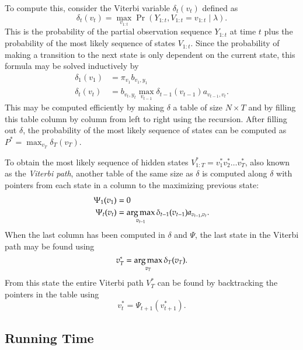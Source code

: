 To compute this, consider the Viterbi variable $\delta_t(v_t)$ defined as
\begin{equation*}
  \delta_t(v_t) = \max_{v_{1:t}} \Pr(Y_{1:t}, V_{1:t} = v_{1:t} \mid \lambda).
\end{equation*}
This is the probability of the partial observation sequence $Y_{1:t}$ at time
$t$ plus the probability of the most likely sequence of states $V_{1:t}$. Since
the probability of making a transition to the next state is only dependent on
the current state, this formula may be solved inductively by
\begin{equation}
  \label{eq:1}
  \begin{aligned}
    \delta_1(v_1) &= \pi_{v_1} b_{v_1, y_1} \\
    \delta_t(v_t) &= b_{v_t, y_t} \max_{v_{t - 1}} \delta_{t - 1}(v_{t - 1}) a_{v_{t - 1}, v_t}.
  \end{aligned}
\end{equation}
This may be computed efficiently by making $\delta$ a table of size
$N \times T$ and by filling this table column by column from left to right
using the recursion. After filling out $\delta$,
the probability of the most likely sequence of states can be computed as
$P^* = \max_{v_T} \delta_T(v_T)$.

To obtain the most likely sequence of hidden states
$V_{1:T}^* = v_1^*v_2^*\dots{}v_T^*$, also known as the \emph{Viterbi path},
another table of the same size as $\delta$ is computed along $\delta$ with
pointers from each state in a column to the maximizing previous state:
\begin{equation*}
  \begin{aligned}
    \Psi_1(v_1) &= 0 \\
    \Psi_t(v_t) &= \operatorname*{arg\,max}_{v_{t - 1}} \delta_{t - 1}(v_{t - 1}) a_{v_{t - 1}, v_t}.
  \end{aligned}
\end{equation*}
When the last column has been computed in $\delta$ and $\Psi$, the last state
in the Viterbi path may be found using
\begin{equation*}
  v_T^* = \operatorname*{arg\,max}_{v_T} \delta_T(v_T).
\end{equation*}
From this state the entire Viterbi path $V_T^*$ can be found by backtracking
the pointers in the table using
\begin{equation*}
  v_t^* = \Psi_{t + 1}(v_{t + 1}^*).
\end{equation*}

\subsection{Running Time}

